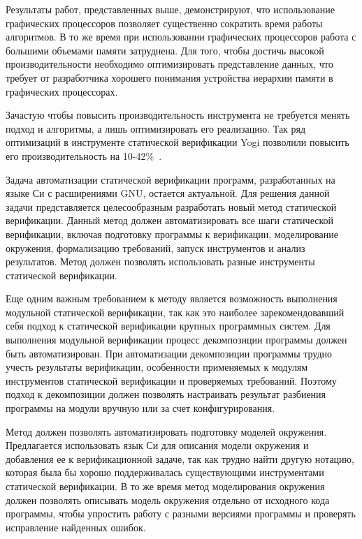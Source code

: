 \documentclass[%
candidate,     %
href,        %
colorlinks,  %
]{disser}
\begin{document}
Результаты работ, представленных выше, демонстрируют, что использование графических процессоров позволяет существенно сократить время работы алгоритмов.
В то же время при использовании графических процессоров работа с большими объемами памяти затруднена.
Для того, чтобы достичь высокой производительности необходимо оптимизировать представление данных, что требует от разработчика хорошего понимания устройства иерархии памяти в графических процессорах.

Зачастую чтобы повысить производительность инструмента не требуется менять подход и алгоритмы, а лишь оптимизировать его реализацию.
Так ряд оптимизаций в инструменте статической верификации Yogi позволили повысить его производительность на 10-42\%~\cite{Yogi}.

Задача автоматизации статической верификации программ, разработанных на языке Си с расширениями GNU, остается актуальной.
Для решения данной задачи представляется целесообразным разработать новый метод статической верификации.
Данный метод должен автоматизировать все шаги статической верификации, включая подготовку программы к верификации, моделирование окружения, формализацию требований, запуск инструментов и анализ результатов.
Метод должен позволять использовать разные инструменты статической верификации.

Еще одним важным требованием к методу является возможность выполнения модульной статической верификации, так как это наиболее зарекомендовавший себя подход к статической верификации крупных программных систем.
Для выполнения модульной верификации процесс декомпозиции программы должен быть автоматизирован.
При автоматизации декомпозиции программы трудно учесть результаты верификации, особенности применяемых к модулям инструментов статической верификации и проверяемых требований.
Поэтому подход к декомпозиции должен позволять настраивать результат разбиения программы на модули вручную или за счет конфигурирования.

Метод должен позволять автоматизировать подготовку моделей окружения.
Предлагается использовать язык Си для описания модели окружения и добавления ее к верификационной задаче, так как трудно найти другую нотацию, которая была бы хорошо поддерживалась существующими инструментами статической верификации.
В то же время метод моделирования окружения должен позволять описывать модель окружения отдельно от исходного кода программы, чтобы упростить работу с разными версиями программы и проверять исправление найденных ошибок.
\end{document}
